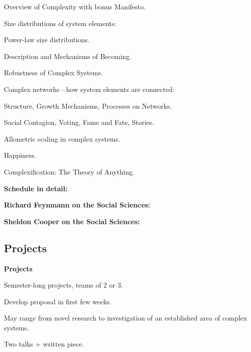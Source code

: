     
      Overview of Complexity with bonus Manifesto.
    
      Size distributions of system elements:
      
      
        Power-law size distributions.
      
        Description and Mechanisms of Becoming.
      
     
      Robustness of Complex Systems.
     
      Complex networks---how system elements are connected:
      
       
        Structure, Growth Mechanisms, Processes on Networks.
       
        Social Contagion, Voting, Fame and Fate, Stories.
      
    
      Allometric scaling in complex systems.
    
      Happiness.
    
      Complexification: The Theory of Anything.
    
  


  \textbf{Schedule in detail:}

  \tiny
  
  




  \textbf{Richard Feynmann on the  Social Sciences:}
  


  
\textbf{Sheldon Cooper on the Social Sciences:}






\subsection{Projects}
  \textbf{Projects}

  
  
  
    Semester-long projects, teams of 2 or 3.
   
    Develop proposal in first few weeks.
   
    May range from novel research to investigation of an established area of complex systems.
   
    Two talks + written piece.
  

